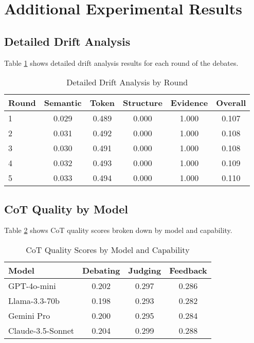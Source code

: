 \documentclass[11pt]{article}
\begin{document}
\section{Additional Experimental Results}

\subsection{Detailed Drift Analysis}

Table \ref{tab:detailed_drift} shows detailed drift analysis results for each round of the debates.

\begin{table}[h]
\centering
\caption{Detailed Drift Analysis by Round}
\label{tab:detailed_drift}
\begin{tabular}{lccccc}
\toprule
Round & Semantic & Token & Structure & Evidence & Overall \\
\midrule
1 & 0.029 & 0.489 & 0.000 & 1.000 & 0.107 \\
2 & 0.031 & 0.492 & 0.000 & 1.000 & 0.108 \\
3 & 0.030 & 0.491 & 0.000 & 1.000 & 0.108 \\
4 & 0.032 & 0.493 & 0.000 & 1.000 & 0.109 \\
5 & 0.033 & 0.494 & 0.000 & 1.000 & 0.110 \\
\bottomrule
\end{tabular}
\end{table}

\subsection{CoT Quality by Model}

Table \ref{tab:cot_by_model} shows CoT quality scores broken down by model and capability.

\begin{table}[h]
\centering
\caption{CoT Quality Scores by Model and Capability}
\label{tab:cot_by_model}
\begin{tabular}{lccc}
\toprule
Model & Debating & Judging & Feedback \\
\midrule
GPT-4o-mini & 0.202 & 0.297 & 0.286 \\
Llama-3.3-70b & 0.198 & 0.293 & 0.282 \\
Gemini Pro & 0.200 & 0.295 & 0.284 \\
Claude-3.5-Sonnet & 0.204 & 0.299 & 0.288 \\
\bottomrule
\end{tabular}
\end{table}
\end{document}
